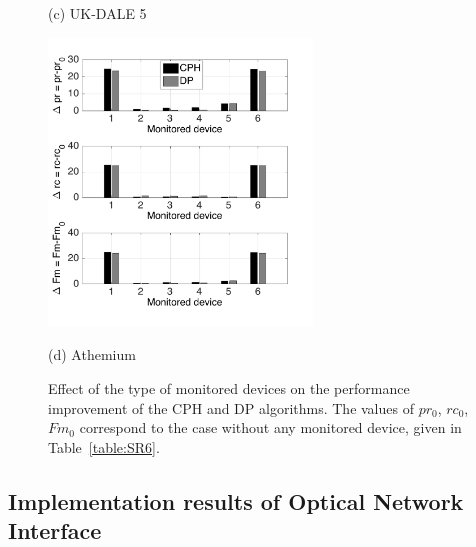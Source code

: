 \begin{figure}[htb]
\begin{minipage}[b]{.48\linewidth}
  \centerline{(c) UK-DALE 5}\medskip
\end{minipage}
\hfill
\begin{minipage}[b]{0.48\linewidth}
  \centering
  \centerline{\includegraphics[width=7cm]{./chapters/chapter5/images/A_kp_1modev.pdf}}
  \centerline{(d) Athemium}\medskip
\end{minipage}
\caption{Effect of the type of monitored devices on the performance improvement of the CPH and DP algorithms. The values of $pr_0$, $rc_0$, $Fm_0$ correspond to the case without any monitored device, given in Table~\ref{table:SR6}.}
\label{fig:SR1}
%
\end{figure}

\subsection{Implementation results of Optical Network Interface}

